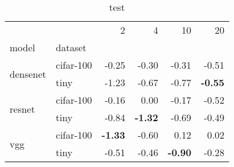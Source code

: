 \begin{table}
\caption{test}
\begin{tabular}{llrrrr}
\toprule
 &  & 2 & 4 & 10 & 20 \\
model & dataset &  &  &  &  \\
\midrule
\multirow[c]{2}{*}{densenet} & cifar-100 & -0.25 & -0.30 & -0.31 & -0.51 \\
 & tiny & -1.23 & -0.67 & -0.77 & \bfseries -0.55 \\
\multirow[c]{2}{*}{resnet} & cifar-100 & -0.16 & 0.00 & -0.17 & -0.52 \\
 & tiny & -0.84 & \bfseries -1.32 & -0.69 & -0.49 \\
\multirow[c]{2}{*}{vgg} & cifar-100 & \bfseries -1.33 & -0.60 & 0.12 & 0.02 \\
 & tiny & -0.51 & -0.46 & \bfseries -0.90 & -0.28 \\
\bottomrule
\end{tabular}
\end{table}
